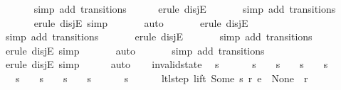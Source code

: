 \begin{isabellebody}
\ \ \ \ \ \isamarkupfalse%
\ {\isacharparenleft}simp\ add{\isacharcolon}\ transitions{\isacharparenright}\isanewline
\ \ \ \ \isamarkupfalse%
\ {\isacharparenleft}erule\ disjE{\isacharparenright}\isanewline
\ \ \ \ \ \isamarkupfalse%
\ {\isacharparenleft}simp\ add{\isacharcolon}\ transitions{\isacharparenright}\isanewline
\ \ \ \ \ \isamarkupfalse%
\ {\isacharparenleft}erule\ disjE{\isacharcomma}\ simp{\isacharparenright}\isanewline
\ \ \ \ \ \isamarkupfalse%
\ auto{\isacharbrackleft}{}{\isacharbrackright}\isanewline
\ \ \ \ \ \isamarkupfalse%
\ {\isacharparenleft}erule\ disjE{\isacharparenright}\isanewline
\ \ \ \ \ \isamarkupfalse%
\ {\isacharparenleft}simp\ add{\isacharcolon}\ transitions{\isacharparenright}\isanewline
\ \ \ \ \ \isamarkupfalse%
\ {\isacharparenleft}erule\ disjE{\isacharparenright}\isanewline
\ \ \ \ \ \isamarkupfalse%
\ {\isacharparenleft}simp\ add{\isacharcolon}\ transitions{\isacharparenright}\isanewline
\ \ \ \ \ \isamarkupfalse%
\ {\isacharparenleft}erule\ disjE{\isacharcomma}\ simp{\isacharparenright}\isanewline
\ \ \ \ \ \isamarkupfalse%
\ auto{\isacharbrackleft}{}{\isacharbrackright}\isanewline
\ \ \ \ \ \isamarkupfalse%
\ {\isacharparenleft}simp\ add{\isacharcolon}\ transitions{\isacharparenright}\isanewline
\ \ \ \ \ \isamarkupfalse%
\ {\isacharparenleft}erule\ disjE{\isacharcomma}\ simp{\isacharparenright}\isanewline
\ \ \ \ \isamarkupfalse%
\ auto\isanewline
\ \ \isamarkupfalse%
%
\endisatagproof
{\isafoldproof}%
%
\isadelimproof
\isanewline
%
\endisadelimproof
\isanewline
{}\isamarkupfalse%
\ invalid{\isacharunderscore}state{\isacharcolon}\isanewline
\ \ {\isachardoublequoteopen}s\ {\isasymnoteq}\ {}\ {\isasymLongrightarrow}\isanewline
\ \ \ s\ {\isasymnoteq}\ {}\ {\isasymand}\ s\ {\isasymnoteq}\ {}\ {\isasymand}\ s\ {\isasymnoteq}\ {}\ {\isasymand}\ s\ {\isasymnoteq}\ {}\ {\isasymLongrightarrow}\isanewline
\ \ \ s\ {\isasymnoteq}\ {}\ {\isasymand}\ s\ {\isasymnoteq}\ {}\ {\isasymand}\ s\ {\isasymnoteq}\ {}\ {\isasymand}\ s\ {\isasymnoteq}\ {}\ {\isasymLongrightarrow}\isanewline
\ \ \ s\ {\isasymnoteq}\ {}\ {\isasymLongrightarrow}\isanewline
\ \ \ ltl{\isacharunderscore}step\ lift\ {\isacharparenleft}Some\ s{\isacharparenright}\ r\ e\ {\isacharequal}\ {\isacharparenleft}None{\isacharcomma}\ {\isacharbrackleft}{\isacharbrackright}{\isacharcomma}\ r{\isacharparenright}{\isachardoublequoteclose}\isanewline

\end{isabellebody}
